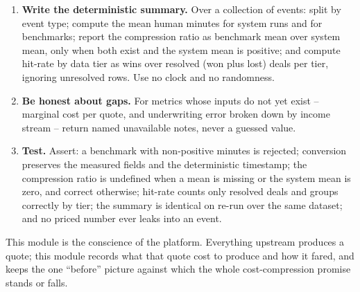 \begin{rebuild}
\begin{enumerate}
  \item \textbf{Write the deterministic summary.} Over a collection of events: split by event type; compute the mean human minutes for system runs and for benchmarks; report the compression ratio as benchmark mean over system mean, only when both exist and the system mean is positive; and compute hit-rate by data tier as wins over resolved (won plus lost) deals per tier, ignoring unresolved rows. Use no clock and no randomness.
  \item \textbf{Be honest about gaps.} For metrics whose inputs do not yet exist -- marginal cost per quote, and underwriting error broken down by income stream -- return named unavailable notes, never a guessed value.
  \item \textbf{Test.} Assert: a benchmark with non-positive minutes is rejected; conversion preserves the measured fields and the deterministic timestamp; the compression ratio is undefined when a mean is missing or the system mean is zero, and correct otherwise; hit-rate counts only resolved deals and groups correctly by tier; the summary is identical on re-run over the same dataset; and no priced number ever leaks into an event.
\end{enumerate}
\end{rebuild}

This module is the conscience of the platform. Everything upstream produces a quote; this module records what that quote cost to produce and how it fared, and keeps the one ``before'' picture against which the whole cost-compression promise stands or falls.
